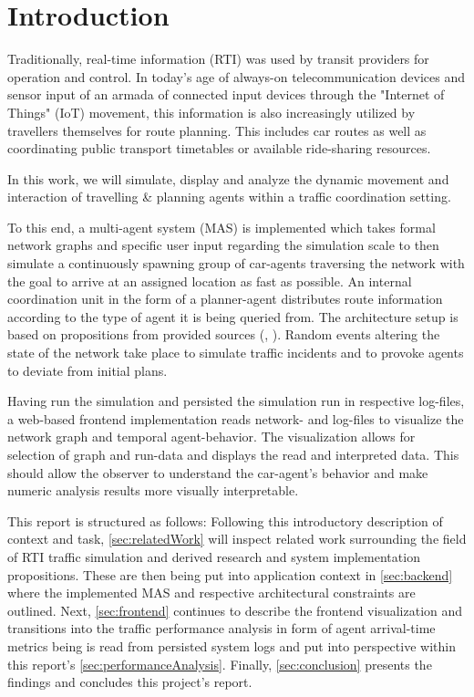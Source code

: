 \section{Introduction}

Traditionally, real-time information (RTI) was used by transit providers for operation and control.
In today's age of always-on telecommunication devices and sensor input of an armada of connected input devices through the "Internet of Things" (IoT) movement, this information is also increasingly utilized by travellers themselves for route planning. This includes car routes as well as coordinating public transport timetables or available ride-sharing resources.

In this work, we will simulate, display and analyze the dynamic movement and interaction of travelling \& planning agents within a traffic coordination setting.

To this end, a multi-agent system (MAS) is implemented which takes formal network graphs and specific user input regarding the simulation scale to then simulate a continuously spawning group of car-agents traversing the network with the goal to arrive at an assigned location as fast as possible.
An internal coordination unit in the form of a planner-agent distributes route information according to the type of agent it is being queried from.
The architecture setup is based on propositions from provided sources (\cite{mastio2015towards}, \cite{brakewood2018literature}).
Random events altering the state of the network take place to simulate traffic incidents and to provoke agents to deviate from initial plans.

Having run the simulation and persisted the simulation run in respective log-files, a web-based frontend implementation reads network- and log-files to visualize the network graph and temporal agent-behavior. The visualization allows for selection of graph and run-data and displays the read and interpreted data.
This should allow the observer to understand the car-agent's behavior and make numeric analysis results more visually interpretable.

This report is structured as follows:
Following this introductory description of context and task, \autoref{sec:relatedWork} will inspect related work surrounding the field of RTI traffic simulation and derived research and system implementation propositions.
These are then being put into application context in \autoref{sec:backend} where the implemented MAS and respective architectural constraints are outlined.
Next, \autoref{sec:frontend} continues to describe the frontend visualization and transitions into the traffic performance analysis in form of agent arrival-time metrics being is read from persisted system logs and put into perspective within this report's \autoref{sec:performanceAnalysis}.
Finally, \autoref{sec:conclusion} presents the findings and concludes this project's report.
